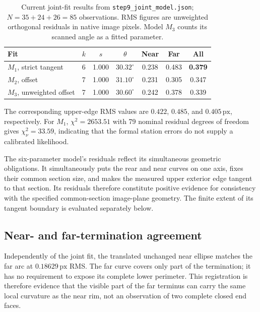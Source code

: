 \documentclass[11pt,letterpaper]{article}
\newcommand{\px}{\,\mathrm{px}}
\newcommand{\sourcepath}[1]{\nolinkurl{#1}}
\begin{document}
\begin{table}[ht]
\centering\small
\caption{Current joint-fit results from \sourcepath{step9_joint_model.json}; \(N=35+24+26=85\) observations. RMS figures are unweighted orthogonal residuals in native image pixels. Model \(M_3\) counts its scanned angle as a fitted parameter.}
\label{tab:joint}
\begin{tabularx}{\linewidth}{@{}l c c c c c c@{}}
\toprule
\textbf{Fit} & \(k\) & \(s\) & \(\theta\) & \textbf{Near} & \textbf{Far} & \textbf{All} \\
\midrule
\(M_1\), strict tangent & 6 & 1.000 & \(30.32^\circ\) & 0.238 & 0.483 & \textbf{0.379} \\
\(M_2\), offset & 7 & 1.000 & \(31.10^\circ\) & 0.231 & 0.305 & 0.347 \\
\(M_3\), unweighted offset & 7 & 1.000 & \(30.60^\circ\) & 0.242 & 0.378 & 0.339 \\
\bottomrule
\end{tabularx}
\vspace{4pt}
\begin{minipage}{0.96\linewidth}\footnotesize\color{slate}
The corresponding upper-edge RMS values are \(0.422\), \(0.485\), and \(0.405\px\), respectively. For \(M_1\), \(\chi^2=2653.51\) with 79 nominal residual degrees of freedom gives \(\chi^2_\nu=33.59\), indicating that the formal station errors do not supply a calibrated likelihood.
\end{minipage}
\end{table}



The six-parameter model's residuals reflect its simultaneous geometric obligations. It simultaneously puts the rear and near curves on one axis, fixes their common section size, and makes the measured upper exterior edge tangent to that section. Its residuals therefore constitute positive evidence for consistency with the specified common-section image-plane geometry. The finite extent of its tangent boundary is evaluated separately below.

\subsection{Near- and far-termination agreement}

Independently of the joint fit, the translated unchanged near ellipse matches the far arc at \(0.18629\px\) RMS. The far curve covers only part of the termination; it has no requirement to expose its complete lower perimeter. This registration is therefore evidence that the visible part of the far terminus can carry the same local curvature as the near rim, not an observation of two complete closed end faces.
\end{document}
